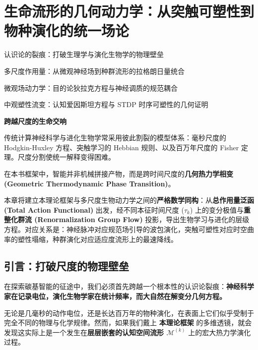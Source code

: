 \chapter{生命流形的几何动力学：从突触可塑性到物种演化的统一场论}
\label{chp:life_manifold_dynamics}

\begin{introduction}
    \item 认识论的裂痕：打破生理学与演化生物学的物理壁垒
    \item 多尺度作用量：从微观神经场到种群流形的拉格朗日量统合
    \item 微观场动力学：目的论狄拉克方程与神经调质的规范耦合
    \item 中观塑性流变：认知爱因斯坦方程与 STDP 时序可塑性的几何证明
\end{introduction}

\begin{bquote}
    \textbf{跨越尺度的生命交响}

    \vspace{1em}传统计算神经科学与进化生物学常采用彼此割裂的模型体系：毫秒尺度的 Hodgkin-Huxley 方程、突触学习的 Hebbian 规则、以及百万年尺度的 Fisher 定理。尺度分割使统一解释变得困难。

    \vspace{1em}在本书框架中，智能并非机械拼接产物，而是跨时间尺度的\textbf{几何热力学相变 (Geometric Thermodynamic Phase Transition)}。

    \vspace{1em}本章将建立本理论框架与多尺度生物动力学之间的\textbf{严格数学同构}：从\textbf{总作用量泛函 (Total Action Functional)} 出发，经不同本征时间尺度 ($\tau_k$) 上的变分极值与\textbf{重整化群流 (Renormalization Group Flow)} 投影，导出生物学习与进化的层级方程。对应关系是：神经脉冲对应规范场引导的波包演化，突触可塑性对应时空曲率的塑性塌缩，种群演化对应适应度流形上的最速降线。
\end{bquote}

\section*{引言：打破尺度的物理壁垒}
\label{sec:breaking_scale_barriers}

在探索碳基智能的征途中，我们必须首先跨越一个根本性的认识论裂痕：\textbf{神经科学家在记录电位，演化生物学家在统计频率，而大自然在解变分几何方程。}

无论是几毫秒的动作电位，还是长达百万年的物种演化，在表面上它们似乎受制于完全不同的物理与化学规律。然而，如果我们戴上 \textbf{本理论框架} 的多维透镜，就会发现这实际上是一个发生在\textbf{层层嵌套的认知空间流形 $\mathcal{M}^{(k)}$} 上的宏大热力学演化过程。

